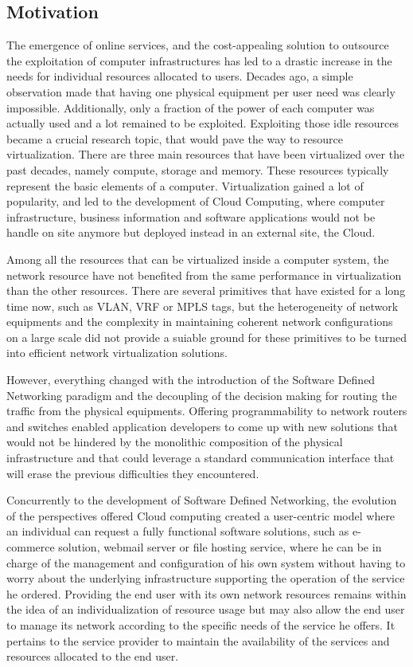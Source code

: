 \subsection{Motivation}

The emergence of online services, and the cost-appealing solution to outsource the exploitation of computer infrastructures has led to a drastic increase in the needs for individual resources allocated to users. Decades ago, a simple observation made that having one physical equipment per user need was clearly impossible. Additionally, only a fraction of the power of each computer was actually used and a lot remained to be exploited.
Exploiting those idle resources became a crucial research topic, that would pave the way to resource virtualization. 
There are three main resources that have been virtualized over the past decades, namely compute, storage and memory.
These resources typically represent the basic elements of a computer.
Virtualization gained a lot of popularity, and led to the development of Cloud Computing, where computer infrastructure, business information and software applications would not be handle on site anymore but deployed instead in an external site, \ie the Cloud.

Among all the resources that can be virtualized inside a computer system, the network resource have not benefited from the same performance in virtualization than the other resources.
There are several primitives that have existed for a long time now, such as VLAN, VRF or MPLS tags, but the heterogeneity of network equipments and the complexity in maintaining coherent network configurations on a large scale did not provide a suiable ground for these primitives to be turned into efficient network virtualization solutions.

However, everything changed with the introduction of the Software Defined Networking paradigm and the decoupling of the decision making for routing the traffic from the physical equipments. Offering programmability to network routers and switches enabled application developers to come up with new solutions that would not be hindered by the monolithic composition of the physical infrastructure and that could leverage a standard communication interface that will erase the previous difficulties they encountered.

Concurrently to the development of Software Defined Networking, the evolution of the perspectives offered Cloud computing created a user-centric model where an individual can request a fully functional software solutions, such as e-commerce solution, webmail server or file hosting service, where he can be in charge of the management and configuration of his own system without having to worry about the underlying infrastructure supporting the operation of the service he ordered.
Providing the end user with its own network resources remains within the idea of an individualization of resource usage but may also allow the end user to manage its network according to the specific needs of the service he offers.
It pertains to the service provider to maintain the availability of the services and resources allocated to the end user.

